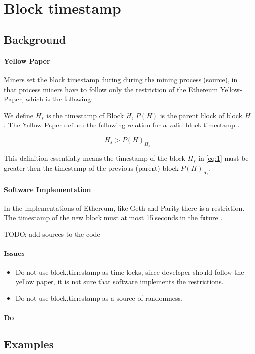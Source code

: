 \section{Block timestamp}

\subsection{Background}


\paragraph{Yellow Paper}

Miners set the block timestamp during during the mining process (source), in
that process miners have to follow only the restriction of the Ethereum
Yellow-Paper, which is the following:

We define $H_s$ is the timestamp of Block $H$, $P(H)$ is the parent
block of block $H$. The Yellow-Paper defines the following relation for a valid
block timestamp \cite{ethyellowpaper2023}.

\begin{equation} \label{eq:1}
H_s > P(H)_{H_s}
\end{equation}

This definition essentially means the timestamp of the block $H_s$ in
\ref{eq:1} must be greater then the timestamp of the previous (parent) block
$P(H)_{H_s}$.

\paragraph{Software Implementation}

In the implementations of Ethereum, like Geth and Parity there is a
restriction. The timestamp of the new block must at most 15 seconds in the
future \cite{Conkas2021}. \newline

TODO: add sources to the code

\paragraph{Issues}

\begin{itemize}
\item Do not use block.timestamp as time locks, since developer should follow the yellow paper, it is not sure that software implements the restrictions.
\item Do not use block.timestamp as a source of randomness.
\end{itemize}


\paragraph{Do }

\subsection{Examples} 
